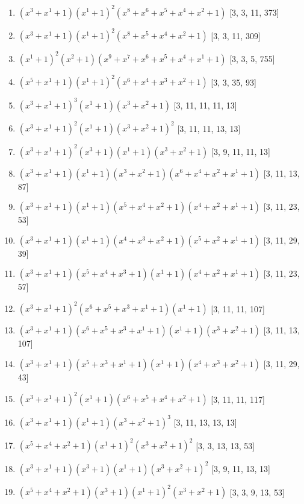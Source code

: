 \documentclass[10pt,twocolumn]{article}
\begin{document}
\begin{enumerate}
\item $(x^{3} + x^{1} + 1)(x^{1} + 1)^{2}(x^{8} + x^{6} + x^{5} + x^{4} + x^{2} + 1)$  [3, 3, 11, 373]
\item $(x^{3} + x^{1} + 1)(x^{1} + 1)^{2}(x^{8} + x^{5} + x^{4} + x^{2} + 1)$  [3, 3, 11, 309]
\item $(x^{1} + 1)^{2}(x^{2} + 1)(x^{9} + x^{7} + x^{6} + x^{5} + x^{4} + x^{1} + 1)$  [3, 3, 5, 755]
\item $(x^{5} + x^{1} + 1)(x^{1} + 1)^{2}(x^{6} + x^{4} + x^{3} + x^{2} + 1)$  [3, 3, 35, 93]
\item $(x^{3} + x^{1} + 1)^{3}(x^{1} + 1)(x^{3} + x^{2} + 1)$  [3, 11, 11, 11, 13]
\item $(x^{3} + x^{1} + 1)^{2}(x^{1} + 1)(x^{3} + x^{2} + 1)^{2}$  [3, 11, 11, 13, 13]
\item $(x^{3} + x^{1} + 1)^{2}(x^{3} + 1)(x^{1} + 1)(x^{3} + x^{2} + 1)$  [3, 9, 11, 11, 13]
\item $(x^{3} + x^{1} + 1)(x^{1} + 1)(x^{3} + x^{2} + 1)(x^{6} + x^{4} + x^{2} + x^{1} + 1)$  [3, 11, 13, 87]
\item $(x^{3} + x^{1} + 1)(x^{1} + 1)(x^{5} + x^{4} + x^{2} + 1)(x^{4} + x^{2} + x^{1} + 1)$  [3, 11, 23, 53]
\item $(x^{3} + x^{1} + 1)(x^{1} + 1)(x^{4} + x^{3} + x^{2} + 1)(x^{5} + x^{2} + x^{1} + 1)$  [3, 11, 29, 39]
\item $(x^{3} + x^{1} + 1)(x^{5} + x^{4} + x^{3} + 1)(x^{1} + 1)(x^{4} + x^{2} + x^{1} + 1)$  [3, 11, 23, 57]
\item $(x^{3} + x^{1} + 1)^{2}(x^{6} + x^{5} + x^{3} + x^{1} + 1)(x^{1} + 1)$  [3, 11, 11, 107]
\item $(x^{3} + x^{1} + 1)(x^{6} + x^{5} + x^{3} + x^{1} + 1)(x^{1} + 1)(x^{3} + x^{2} + 1)$  [3, 11, 13, 107]
\item $(x^{3} + x^{1} + 1)(x^{5} + x^{3} + x^{1} + 1)(x^{1} + 1)(x^{4} + x^{3} + x^{2} + 1)$  [3, 11, 29, 43]
\item $(x^{3} + x^{1} + 1)^{2}(x^{1} + 1)(x^{6} + x^{5} + x^{4} + x^{2} + 1)$  [3, 11, 11, 117]
\item $(x^{3} + x^{1} + 1)(x^{1} + 1)(x^{3} + x^{2} + 1)^{3}$  [3, 11, 13, 13, 13]
\item $(x^{5} + x^{4} + x^{2} + 1)(x^{1} + 1)^{2}(x^{3} + x^{2} + 1)^{2}$  [3, 3, 13, 13, 53]
\item $(x^{3} + x^{1} + 1)(x^{3} + 1)(x^{1} + 1)(x^{3} + x^{2} + 1)^{2}$  [3, 9, 11, 13, 13]
\item $(x^{5} + x^{4} + x^{2} + 1)(x^{3} + 1)(x^{1} + 1)^{2}(x^{3} + x^{2} + 1)$  [3, 3, 9, 13, 53]

\end{enumerate}
\end{document}
